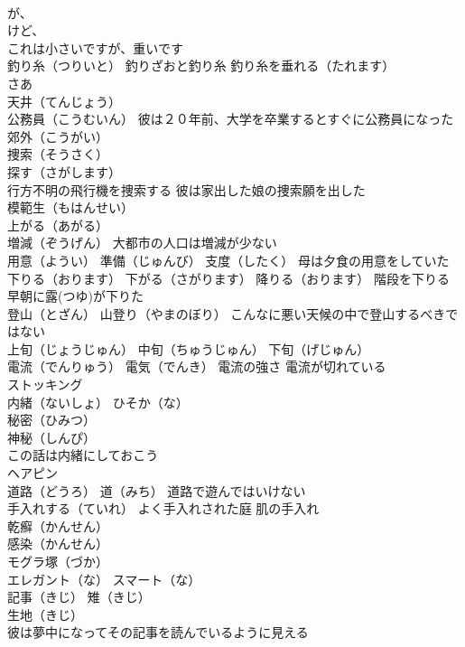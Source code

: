 \documentclass[8pt]{extreport}
\begin{document}
\begin{CJK}{UTF8}{min}
\\	が、
\\	けど、
\\	これは小さいですが、重いです
\\	釣り糸（つりいと） 釣りざおと釣り糸 釣り糸を垂れる（たれます）
\\	さあ
\\	天井（てんじょう）
\\	公務員（こうむいん） 彼は２０年前、大学を卒業するとすぐに公務員になった
\\	郊外（こうがい）
\\	捜索（そうさく） 
\\	探す（さがします） 
\\	行方不明の飛行機を捜索する 彼は家出した娘の捜索願を出した
\\	模範生（もはんせい）
\\	上がる（あがる）
\\	増減（ぞうげん） 大都市の人口は増減が少ない
\\	用意（ようい） 準備（じゅんび） 支度（したく） 母は夕食の用意をしていた
\\	下りる（おります） 下がる（さがります） 降りる（おります） 階段を下りる 早朝に露(つゆ)が下りた
\\	登山（とざん） 山登り（やまのぼり） こんなに悪い天候の中で登山するべきではない
\\	上旬（じょうじゅん） 中旬（ちゅうじゅん） 下旬（げじゅん）
\\	電流（でんりゅう） 電気（でんき） 電流の強さ 電流が切れている
\\	ストッキング
\\	内緒（ないしょ） ひそか（な）
\\	秘密（ひみつ）
\\	神秘（しんぴ）
\\	この話は内緒にしておこう
\\	ヘアピン
\\	道路（どうろ） 道（みち） 道路で遊んではいけない
\\	手入れする（ていれ） よく手入れされた庭 肌の手入れ
\\	乾癬（かんせん） 
\\	感染（かんせん）
\\	モグラ塚（づか）
\\	エレガント（な） スマート（な）
\\	記事（きじ） 雉（きじ）
\\	生地（きじ）
\\	彼は夢中になってその記事を読んでいるように見える

\end{CJK}
\end{document}

